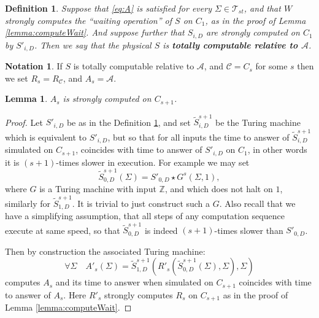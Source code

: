 \documentclass[9pt,twocolumn,twoside,lineno]{pnas-new}
\numberwithin{equation}{section}
\newtheorem{lemma}[equation]{Lemma}
\newtheorem{definition}[equation]{Definition}
\theoremstyle{definition}
\newtheorem{notation}{Notation}
\theoremstyle{remark}
\begin{document}
\begin{definition} \label{def:totallycomputed}
   Suppose that \eqref{eq:A} is satisfied for every  $\Sigma \in \mathcal{T} _{st} $, and that  $W$ strongly computes the ``waiting operation'' of $S$ on $C _{1} $, as in the proof of Lemma \ref{lemma:computeWait}. 
   And suppose further that $S  _{i,D}$ are strongly computed on $C _{1} $ by $S' _{i,D} $.   Then we say that the physical $S$ is \textbf{\emph{totally computable relative to $\mathcal{A}$}}.
\end{definition}
\begin{notation}
 If $S$ is totally computable relative to $\mathcal{A}$, and $\mathcal{C}=C _{s} $ for some $s$ then we set $R _{s} = R _{\mathcal{C}} $, and $A _{s}= \mathcal{A}$. 
   \end{notation}
\begin{lemma} \label{lemma:slowdown}
   ${A} _{s}$ is strongly computed on $C _{s+1} $.
\end{lemma}
\begin{proof}
Let $S' _{i,D} $ be as in the Definition \ref{def:totallycomputed}, and set $\widetilde{S} ^{s+1}  _{i,D} $ be the Turing machine which is equivalent to ${S}' _{i,D} $, but so that for all inputs the time to answer of $\widetilde{S}_ {i,D} ^{s+1}$ simulated on $C _{s+1} $, coincides with time to answer of $S '_ {i,D}  $ on $C _{1} $, in other words it is $(s+1)$-times slower in execution. For example we may set $$\widetilde{S} ^{s+1}  _{0,D}  (\Sigma)= S' _{0,D}  \star G ^{s} (\Sigma, 1),   $$ where $G$ is a Turing machine with input $\mathbb{Z}$, and which does not halt on $1$, similarly for $\widetilde{S} _{1,D} ^{s+1} $. It is trivial to just  construct such a $G$. Also recall that  we have a simplifying assumption, that all  steps of  any computation sequence execute at same speed, so that $\widetilde{S} ^{s+1}  _{0,D}$ is indeed $(s+1)$-times slower than $S' _{0,D} $.

Then by construction the associated Turing machine:
\begin{equation} \label{eq:A'}
  \forall \Sigma \quad {A}' _{s}  (\Sigma)=  \widetilde{S} ^{s+1}    _{1,D}  (R' _{s} (\widetilde{S} ^{s+1}  _{0,D} (\Sigma), \Sigma), \Sigma) 
\end{equation}
computes $A _{s} $ and its time to answer when simulated on $C _{s+1} $ coincides with time to answer of $A _{s} $. Here $R' _{s} $ strongly computes $R _{s} $ on $C _{s+1} $ as in the proof of Lemma \ref{lemma:computeWait}.
\end{proof}
\end{document}
